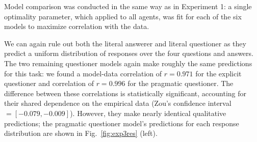 \documentclass[12pt, floatsintext, jou]{apa6}
\begin{document}
Model comparison was conducted in the same way as in Experiment 1: a single optimality parameter, which applied to all agents, was fit for each of the six models to maximize correlation with the data.

We can again rule out both the literal answerer and literal questioner as they predict a uniform distribution of responses over the four questions and answers. The two remaining questioner models again make roughly the same predictions for this task:
we found a model-data correlation of $r = 0.971$ for the explicit questioner and correlation of $r = 0.996$ for the pragmatic questioner. The difference between these correlations is statistically significant, accounting for their shared dependence on the empirical data (Zou's confidence interval $= [-0.079, -0.009]$). However, they make nearly identical qualitative predictions; the pragmatic questioner model's predictions for each response distribution are shown in Fig.~\ref{fig:exp3res} (left). 
\end{document}
